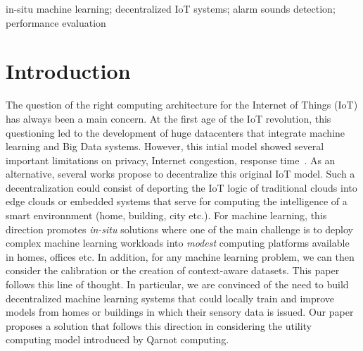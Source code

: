 \documentclass[10pt, conference, compsocconf]{IEEEtran}
\begin{document}
\begin{IEEEkeywords}
in-situ machine learning; decentralized IoT systems; alarm sounds detection;  performance evaluation

\end{IEEEkeywords}


%
\IEEEpeerreviewmaketitle


\section{Introduction} \label{Introduction}

The question of the right computing architecture for the Internet of Things (IoT) has always been a main concern. At the first age of the 
IoT revolution, this questioning led to the development of huge datacenters that integrate machine learning and Big Data systems. 
However, this intial model showed several important limitations on privacy, Internet congestion, 
response time~\cite{DBLP:conf/lcn/Roelands13}. As an alternative, several works propose to decentralize this original IoT model. 
Such a decentralization could consist of deporting the IoT logic of traditional clouds into edge clouds or embedded 
systems that serve for computing the intelligence of a smart environnment (home, building, city etc.). For machine learning, 
this direction promotes {\it in-situ} solutions where one of the main challenge is to deploy complex machine learning 
workloads into {\it modest} computing platforms available in homes, offices etc. In addition, for any machine learning problem, 
we can then consider the calibration or the creation of context-aware datasets. 
This paper follows this line of thought. In particular, we are convinced of the need to build decentralized machine learning 
systems that could locally train and improve models from homes or buildings in which their sensory data is issued. 
Our paper proposes a solution that follows this direction in considering the utility computing model introduced by 
Qarnot computing. 
\end{document}
